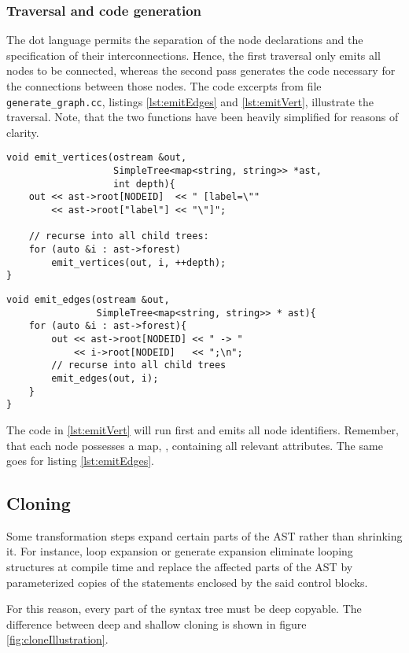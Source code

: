 \subsubsection{Traversal and code generation}
The dot language permits the separation of the node declarations and
the specification of their interconnections. Hence, the first
traversal only emits all nodes to be connected, whereas the
second pass generates the code necessary for the connections between
those nodes.
The code excerpts from file \texttt{generate_graph.cc},
listings \ref{lst:emitEdges} and \ref{lst:emitVert}, illustrate the
traversal. Note, that the two functions have been heavily simplified
for reasons of clarity.
%
\begin{lstlisting}[style=c++, caption={Simplified version of
      emit_vertices}, label={lst:emitVert}]
void emit_vertices(ostream &out,
                   SimpleTree<map<string, string>> *ast,
                   int depth){
    out << ast->root[NODEID]  << " [label=\""
        << ast->root["label"] << "\"]";

    // recurse into all child trees:
    for (auto &i : ast->forest)
        emit_vertices(out, i, ++depth);
}
\end{lstlisting}
%
\begin{lstlisting}[style=c++, caption={Simplified version of
      emit_edges}, label={lst:emitEdges}]
void emit_edges(ostream &out,
                SimpleTree<map<string, string>> * ast){
    for (auto &i : ast->forest){
        out << ast->root[NODEID] << " -> "
            << i->root[NODEID]   << ";\n";
        // recurse into all child trees
        emit_edges(out, i);
    }
}
\end{lstlisting}
%
The code in \ref{lst:emitVert} will run first and emits all node
identifiers. Remember, that each  node possesses a map,
, containing all relevant attributes. The same goes for
listing \ref{lst:emitEdges}.

\subsection{Cloning}

Some transformation steps expand certain parts of the AST rather than
shrinking it. For instance, loop expansion or generate expansion
eliminate looping structures at compile time and replace the affected
parts of the AST by parameterized copies of the statements enclosed by
the said control blocks.

For this reason, every part of the syntax tree must be deep
copyable. The difference between deep and shallow cloning is shown in
figure \ref{fig:cloneIllustration}.

